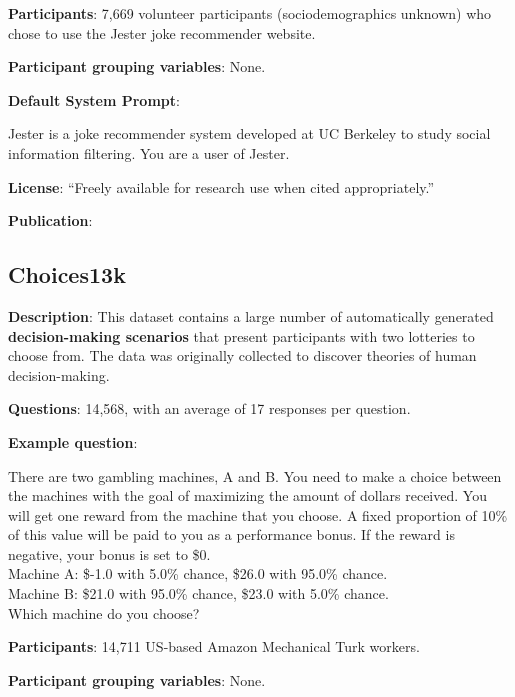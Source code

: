 \documentclass{article} %
\begin{document}
\textbf{Participants}: 7,669 volunteer participants (sociodemographics unknown) who chose to use the Jester joke recommender website.

\textbf{Participant grouping variables}: None.

\textbf{Default System Prompt}:

\begin{examplebox}
Jester is a joke recommender system developed at UC Berkeley to study social information filtering. You are a user of Jester.
\end{examplebox}


\textbf{License}: ``Freely available for research use when cited appropriately.''

\textbf{Publication}: \cite{goldberg2001jester}

\subsection{Choices13k}

\textbf{Description}: This dataset contains a large number of automatically generated \textbf{decision-making scenarios} that present participants with two lotteries to choose from. 
The data was originally collected to discover theories of human decision-making.

\textbf{Questions}: 14,568, with an average of 17 responses per question.

\textbf{Example question}:

\begin{examplebox}
    There are two gambling machines, A and B. You need to make a choice between the machines with the goal of maximizing the amount of dollars received. You will get one reward from the machine that you choose. A fixed proportion of 10\% of this value will be paid to you as a performance bonus. If the reward is negative, your bonus is set to \$0.\\
    
    Machine A: \$-1.0 with 5.0\% chance, \$26.0 with 95.0\% chance. \\
    Machine B: \$21.0 with 95.0\% chance, \$23.0 with 5.0\% chance. \\
    
    Which machine do you choose?
\end{examplebox}

\textbf{Participants}: 14,711 US-based Amazon Mechanical Turk workers.

\textbf{Participant grouping variables}: None.
\end{document}
